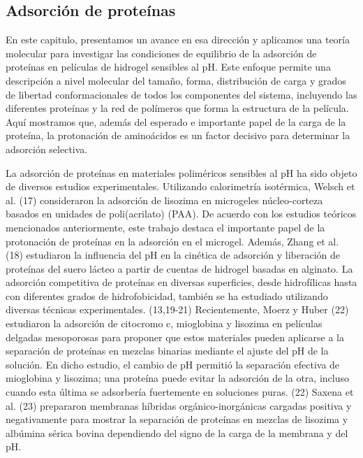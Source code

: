 \subsection{Adsorci\'on de prote\'inas}

En este capitulo, presentamos un avance en esa dirección y aplicamos una teoría molecular para investigar las condiciones de equilibrio de la adsorción  de proteínas en películas de hidrogel sensibles al pH. Este enfoque permite una descripción a nivel molecular del tamaño, forma, distribución de carga y grados de libertad conformacionales de todos los componentes del sistema, incluyendo las diferentes proteínas y la red de polímeros que forma la estructura de la película. Aquí mostramos que, además del esperado e importante papel de la carga de la proteína, la protonación de aminoácidos es un factor decisivo para determinar la adsorción selectiva.

La adsorción de proteínas en materiales poliméricos sensibles al pH ha sido objeto de diversos estudios experimentales. Utilizando calorimetría isotérmica, Welsch et al. (17) consideraron la adsorción de lisozima en microgeles núcleo-corteza basados en unidades de poli(acrilato) (PAA). De acuerdo con los estudios teóricos mencionados anteriormente, este trabajo destaca el importante papel de la protonación de proteínas en la adsorción en el microgel. Además, Zhang et al. (18) estudiaron la influencia del pH en la cinética de adsorción y liberación de proteínas del suero lácteo a partir de cuentas de hidrogel basadas en alginato. La adsorción competitiva de proteínas en diversas superficies, desde hidrofílicas hasta con diferentes grados de hidrofobicidad, también se ha estudiado utilizando diversas técnicas experimentales. (13,19-21) Recientemente, Moerz y Huber (22) estudiaron la adsorción de citocromo c, mioglobina y lisozima en películas delgadas mesoporosas para proponer que estos materiales pueden aplicarse a la separación de proteínas en mezclas binarias mediante el ajuste del pH de la solución. En dicho estudio, el cambio de pH permitió la separación efectiva de mioglobina y lisozima; una proteína puede evitar la adsorción de la otra, incluso cuando esta última se adsorbería fuertemente en soluciones puras. (22) Saxena et al. (23) prepararon membranas híbridas orgánico-inorgánicas cargadas positiva y negativamente para mostrar la separación de proteínas en mezclas de lisozima y albúmina sérica bovina dependiendo del signo de la carga de la membrana y del pH.



